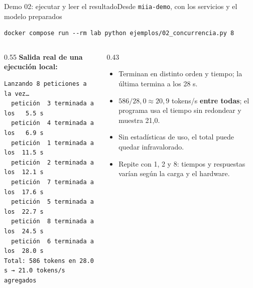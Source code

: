 \begin{frame}[fragile]{Demo 02: ejecutar y leer el resultado}{Desde \texttt{miia-demo}, con los servicios y el modelo preparados}
	\begin{lstlisting}[language={}]
docker compose run --rm lab python ejemplos/02_concurrencia.py 8
\end{lstlisting}
	\begin{columns}[T]
		\begin{column}{0.55\textwidth}
			{\scriptsize\textbf{Salida real de una ejecución local:}}
			\begin{lstlisting}[language={}]
Lanzando 8 peticiones a la vez…
  petición  3 terminada a los   5.5 s
  petición  4 terminada a los   6.9 s
  petición  1 terminada a los  11.5 s
  petición  2 terminada a los  12.1 s
  petición  7 terminada a los  17.6 s
  petición  5 terminada a los  22.7 s
  petición  8 terminada a los  24.5 s
  petición  6 terminada a los  28.0 s
Total: 586 tokens en 28.0 s → 21.0 tokens/s agregados
\end{lstlisting}
		\end{column}
		\begin{column}{0.43\textwidth}
			\footnotesize
			\begin{itemize}
				\item Terminan en distinto orden y tiempo; la última termina a los 28 s.
				\item $586 / 28{,}0 \approx 20{,}9$ tokens/s \textbf{entre todas}; el programa usa el tiempo sin redondear y muestra 21,0.
				\item Sin estadísticas de uso, el total puede quedar infravalorado.
				\item Repite con 1, 2 y 8: tiempos y respuestas varían según la carga y el hardware.
			\end{itemize}
		\end{column}
	\end{columns}
\end{frame}

